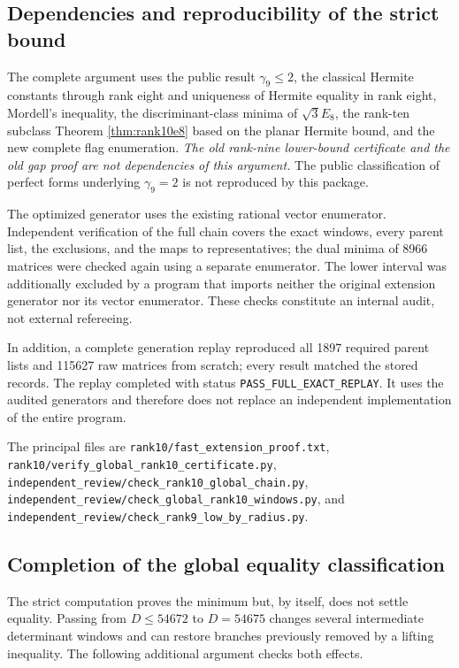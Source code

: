 \documentclass[11pt,a4paper]{article}
\theoremstyle{remark}\newtheorem{remark}[theorem]{Remark}
\newcommand{\file}[1]{{\small\nolinkurl{#1}}}
\begin{document}
\subsection{Dependencies and reproducibility of the strict bound}

The complete argument uses the public result $\gamma_9\le2$, the classical Hermite constants through rank eight and uniqueness of Hermite equality in rank eight, Mordell's inequality, the discriminant-class minima of $\sqrt3E_8$, the rank-ten subclass Theorem \ref{thm:rank10e8} based on the planar Hermite bound, and the new complete flag enumeration. \emph{The old rank-nine lower-bound certificate and the old gap proof are not dependencies of this argument.} The public classification of perfect forms underlying $\gamma_9=2$ is not reproduced by this package.

The optimized generator uses the existing rational vector enumerator. Independent verification of the full chain covers the exact windows, every parent list, the exclusions, and the maps to representatives; the dual minima of 8966 matrices were checked again using a separate enumerator. The lower interval was additionally excluded by a program that imports neither the original extension generator nor its vector enumerator. These checks constitute an internal audit, not external refereeing.

In addition, a complete generation replay reproduced all 1897 required parent lists and 115627 raw matrices from scratch; every result matched the stored records. The replay completed with status \file{PASS_FULL_EXACT_REPLAY}. It uses the audited generators and therefore does not replace an independent implementation of the entire program.

The principal files are \file{rank10/fast_extension_proof.txt},
\file{rank10/verify_global_rank10_certificate.py},
\file{independent_review/check_rank10_global_chain.py},
\file{independent_review/check_global_rank10_windows.py}, and
\file{independent_review/check_rank9_low_by_radius.py}.

\subsection{Completion of the global equality classification}\label{subsec:complete10equality}

The strict computation proves the minimum but, by itself, does not settle equality. Passing from $D\le54672$ to $D=54675$ changes several intermediate determinant windows and can restore branches previously removed by a lifting inequality. The following additional argument checks both effects.
\end{document}
